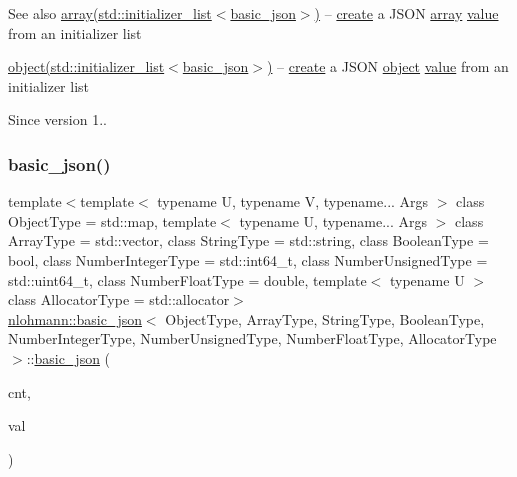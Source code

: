 \begin{DoxySeeAlso}{See also}
\hyperlink{classnlohmann_1_1basic__json_a5685815624b086caa532f41e853d4b0f}{array(std\+::initializer\+\_\+list$<$basic\+\_\+json$>$)} -- \hyperlink{classnlohmann_1_1basic__json_afdb7a485369fbfd8c4c7c134ebb1feb5}{create} a J\+S\+ON \hyperlink{classnlohmann_1_1basic__json_a5685815624b086caa532f41e853d4b0f}{array} \hyperlink{classnlohmann_1_1basic__json_a407e73a037e6e3067ef7aa2c25a79f39}{value} from an initializer list 

\hyperlink{classnlohmann_1_1basic__json_ad25b2f8c21e241e2d63455537a9294ff}{object(std\+::initializer\+\_\+list$<$basic\+\_\+json$>$)} -- \hyperlink{classnlohmann_1_1basic__json_afdb7a485369fbfd8c4c7c134ebb1feb5}{create} a J\+S\+ON \hyperlink{classnlohmann_1_1basic__json_ad25b2f8c21e241e2d63455537a9294ff}{object} \hyperlink{classnlohmann_1_1basic__json_a407e73a037e6e3067ef7aa2c25a79f39}{value} from an initializer list
\end{DoxySeeAlso}
\begin{DoxySince}{Since}
version 1.. 
\end{DoxySince}
\hypertarget{classnlohmann_1_1basic__json_a112a2d8e76345ea64f71e2985fee4c52}{}\label{classnlohmann_1_1basic__json_a112a2d8e76345ea64f71e2985fee4c52} 
\subsubsection{\texorpdfstring{basic\+\_\+json()}{basic\_json()}\hspace{0.1cm}{\footnotesize\ttfamily [19/23]}}
{\footnotesize\ttfamily template$<$template$<$ typename U, typename V, typename... Args $>$ class Object\+Type = std\+::map, template$<$ typename U, typename... Args $>$ class Array\+Type = std\+::vector, class String\+Type  = std\+::string, class Boolean\+Type  = bool, class Number\+Integer\+Type  = std\+::int64\+\_\+t, class Number\+Unsigned\+Type  = std\+::uint64\+\_\+t, class Number\+Float\+Type  = double, template$<$ typename U $>$ class Allocator\+Type = std\+::allocator$>$ \\
\hyperlink{classnlohmann_1_1basic__json}{nlohmann\+::basic\+\_\+json}$<$ Object\+Type, Array\+Type, String\+Type, Boolean\+Type, Number\+Integer\+Type, Number\+Unsigned\+Type, Number\+Float\+Type, Allocator\+Type $>$\+::\hyperlink{classnlohmann_1_1basic__json}{basic\+\_\+json} (\begin{DoxyParamCaption}\item[{\hyperlink{classnlohmann_1_1basic__json_a1579a8f72a230358d6cd1a6e8a62859b}{size\+\_\+type}}]{cnt,  }\item[{const \hyperlink{classnlohmann_1_1basic__json}{basic\+\_\+json}$<$ Object\+Type, Array\+Type, String\+Type, Boolean\+Type, Number\+Integer\+Type, Number\+Unsigned\+Type, Number\+Float\+Type, Allocator\+Type $>$ \&}]{val }\end{DoxyParamCaption})\hspace{0.3cm}{\ttfamily [inline]}}



